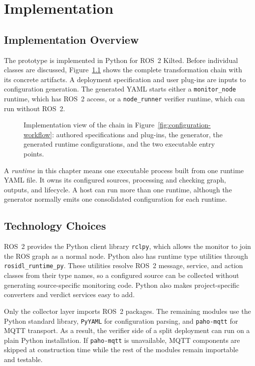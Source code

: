 \chapter{Implementation}\label{chapter:implementation}

\section{Implementation Overview}

The prototype is implemented in Python for ROS~2 Kilted. Before individual
classes are discussed, Figure~\ref{fig:implementation-chain} shows the complete
transformation chain with its concrete artifacts. A deployment specification
and user plug-ins are inputs to configuration generation. The generated YAML
starts either a \texttt{monitor\_node} runtime, which has ROS~2 access, or a
\texttt{node\_runner} verifier runtime, which can run without ROS~2.

\begin{figure}[htbp]
  \centering
  \resizebox{\textwidth}{!}{}
  \caption{Implementation view of the chain in
  Figure~\ref{fig:configuration-workflow}: authored specifications and
  plug-ins, the generator, the generated runtime configurations, and the two
  executable entry points.}
  \label{fig:implementation-chain}
\end{figure}

A \emph{runtime} in this chapter means one executable process built from one
runtime YAML file. It owns its configured sources, processing and checking
graph, outputs, and lifecycle. A host can run more than one runtime, although
the generator normally emits one consolidated configuration for each runtime.

\section{Technology Choices}

ROS~2 provides the Python client library \texttt{rclpy}, which allows the
monitor to join the ROS graph as a normal node. Python also has runtime type
utilities through \texttt{rosidl\_runtime\_py}. These utilities resolve ROS~2
message, service, and action classes from their type names, so a configured
source can be collected without generating source-specific monitoring code.
Python also makes project-specific converters and verdict services easy to
add.

Only the collector layer imports ROS~2 packages. The remaining modules use the
Python standard library, \texttt{PyYAML} for configuration parsing, and
\texttt{paho-mqtt} for MQTT transport. As a result, the verifier side of a
split deployment can run on a plain Python installation. If \texttt{paho-mqtt}
is unavailable, MQTT components are skipped at construction time while the rest
of the modules remain importable and testable.

